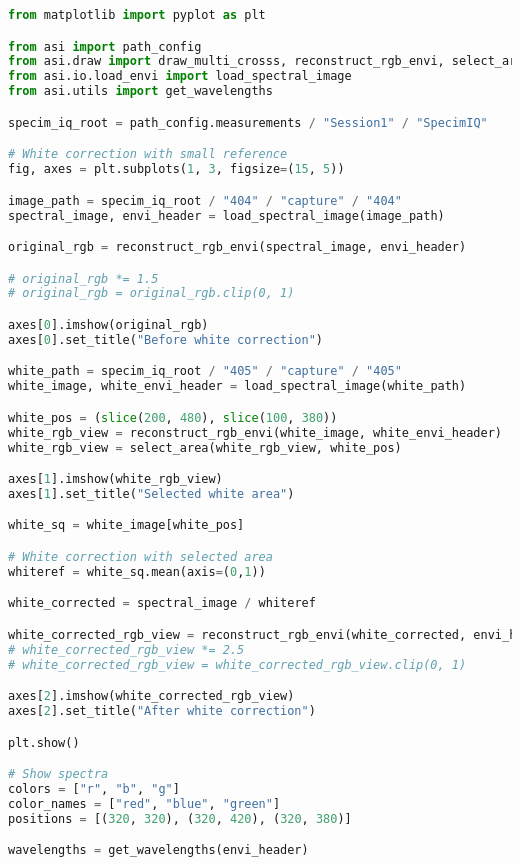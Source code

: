 \begin{lstlisting}[language=python, caption=White correction for SpecimIQ with large reference, label={code:wc-specimiq-large}]
from matplotlib import pyplot as plt

from asi import path_config
from asi.draw import draw_multi_crosss, reconstruct_rgb_envi, select_area
from asi.io.load_envi import load_spectral_image
from asi.utils import get_wavelengths

specim_iq_root = path_config.measurements / "Session1" / "SpecimIQ"

# White correction with small reference
fig, axes = plt.subplots(1, 3, figsize=(15, 5))

image_path = specim_iq_root / "404" / "capture" / "404"
spectral_image, envi_header = load_spectral_image(image_path)

original_rgb = reconstruct_rgb_envi(spectral_image, envi_header)

# original_rgb *= 1.5
# original_rgb = original_rgb.clip(0, 1)

axes[0].imshow(original_rgb)
axes[0].set_title("Before white correction")

white_path = specim_iq_root / "405" / "capture" / "405"
white_image, white_envi_header = load_spectral_image(white_path)

white_pos = (slice(200, 480), slice(100, 380))
white_rgb_view = reconstruct_rgb_envi(white_image, white_envi_header)
white_rgb_view = select_area(white_rgb_view, white_pos)

axes[1].imshow(white_rgb_view)
axes[1].set_title("Selected white area")

white_sq = white_image[white_pos]

# White correction with selected area
whiteref = white_sq.mean(axis=(0,1))

white_corrected = spectral_image / whiteref

white_corrected_rgb_view = reconstruct_rgb_envi(white_corrected, envi_header)
# white_corrected_rgb_view *= 2.5
# white_corrected_rgb_view = white_corrected_rgb_view.clip(0, 1)

axes[2].imshow(white_corrected_rgb_view)
axes[2].set_title("After white correction")

plt.show()

# Show spectra
colors = ["r", "b", "g"]
color_names = ["red", "blue", "green"]
positions = [(320, 320), (320, 420), (320, 380)]

wavelengths = get_wavelengths(envi_header)


\end{lstlisting}
